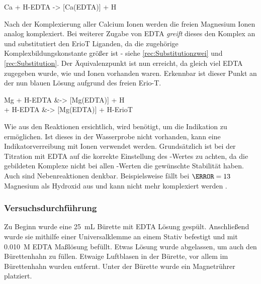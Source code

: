 \documentclass{article}
\begin{document}
      \begin{reaction}
        Ca\pch[2]\aq{} + H-EDTA\mch[3]\aq{} -> [Ca(EDTA)]\mch[2]\aq{} + H\pch\aq{} \label{rec:KomplexbildungCa}
      \end{reaction}
      
      Nach der Komplexierung aller Calcium Ionen werden die freien Magnesium Ionen analog komplexiert. Bei weiterer Zugabe von EDTA \textit{greift} dieses den \ch{[Mg(ErioT)]\mch\aq{}} Komplex an und substitutiert den ErioT Liganden, da die zugehörige Komplexbildungskonstante größer ist - siehe \ref{rec:Substitutionzwei} und  \ref{rec:Substitution}. Der Äquivalenzpunkt ist nun erreicht, da gleich viel EDTA zugegeben wurde, wie  und  Ionen vorhanden waren. Erkennbar ist dieser Punkt an der nun blauen Lösung aufgrund des freien Erio-T.
      
      \begin{reactions}
        Mg\pch[2]\aq{} + H-EDTA\mch[3]\aq{} &-> [Mg(EDTA)]\mch[2]\aq{} + H\pch\aq{} \label{rec:Substitutionzwei} \\
        [Mg(ErioT)]\mch\aq{} + H-EDTA\mch[3]\aq{} &-> [Mg(EDTA)]\mch[2]\aq{}  + H-ErioT\mch[2]\aq{} \label{rec:Substitution}
      \end{reactions}
      
      Wie aus den Reaktionen ersichtlich, wird  benötigt, um die Indikation zu ermöglichen. Ist dieses in der Wasserprobe nicht vorhanden, kann eine Indikatorverreibung mit  Ionen verwendet werden. Grundsätzlich ist bei der Titration mit EDTA auf die korrekte Einstellung des \pH-Wertes zu achten, da die gebildeten Komplexe nicht bei allen \pH-Werten die gewünschte Stabilität haben. Auch sind Nebenreaktionen denkbar. Beispielsweise fällt bei $\pH=13$ Magnesium als Hydroxid aus und kann nicht mehr komplexiert werden \cite[S. 146]{JanderBlasius}.
      
      \subsubsection{Versuchsdurchführung} \label{sec:Versucharte}
        Zu Beginn wurde eine \SI[mode=text,separate-uncertainty=true]{25}{\milli\liter} Bürette mit EDTA Lösung gespült. Anschließend wurde sie mithilfe einer Universalklemme an einem Stativ befestigt und mit \SI[mode=text]{0.010}{M} EDTA Maßlösung befüllt. Etwas Lösung wurde abgelassen, um auch den Bürettenhahn zu füllen. Etwaige Luftblasen in der Bürette, vor allem im Bürettenhahn wurden entfernt. Unter der Bürette wurde ein Magnetrührer platziert. 
        
\end{document}
